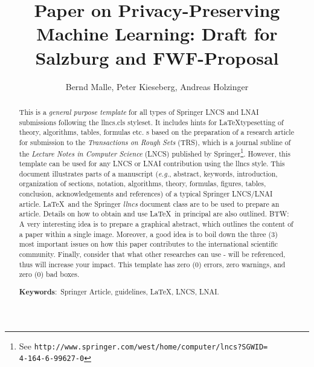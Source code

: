 \documentclass{llncs}
\begin{document}
\title{Paper on Privacy-Preserving Machine Learning:  \protect\newline
Draft for Salzburg and FWF-Proposal}

\author{Bernd Malle, Peter Kieseberg, Andreas Holzinger}

\maketitle

\begin{abstract}
This is a \textit{general purpose template} for all types of Springer LNCS and LNAI submissions following the llncs.cls styleset. It includes hints for \LaTeX typesetting of theory, algorithms, tables, formulas etc. s based on the preparation of a research article for submission to the {\it Transactions on Rough Sets} (TRS), which is a journal subline of the {\it Lecture Notes in Computer Science} (LNCS) published by Springer\footnote{See \texttt{http://www.springer.com/west/home/computer/lncs?SGWID=}\\\texttt{4-164-6-99627-0}}. However, this template can be used for any LNCS or LNAI contribution using the llncs style. This document illustrates parts of a manuscript ({\em e.g.}, abstract, keywords, introduction, organization of sections, notation, algorithms, theory, formulas, figures, tables, conclusion, acknowledgements and references) of a typical Springer LNCS/LNAI article.   \LaTeX~and the Springer \emph{llncs} document class are to be used to prepare an article. Details on how to obtain and use \LaTeX~in principal are also outlined. BTW: A very interesting idea is to prepare a graphical abstract, which outlines the content of a paper within a single image. Moreover, a good idea is to boil down the three (3) most important issues on how this paper contributes to the international scientific community. Finally, consider that what other researches can use - will be referenced, thus will increase your impact. This template has zero (0) errors, zero warnings, and zero (0) bad boxes.

\medskip

\textbf{Keywords}:~Springer Article, guidelines, \LaTeX, LNCS, LNAI.

\end{abstract}
\end{document}
